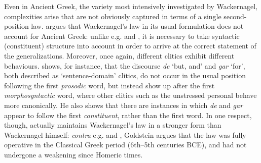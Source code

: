 Even in Ancient Greek, the variety most intensively investigated by Wackernagel, complexities arise that are not obviously captured in terms of a single second-position law. \citet{Taylor1990} argues that Wackernagel's law in its usual formulation does not account for Ancient Greek: unlike e.g. \citet{Dover1960} and \citet{Marshall1987}, it is necessary to take syntactic (constituent) structure into account in order to arrive at the correct statement of the generalizations. Moreover, once again, different clitics exhibit different behaviours. \citet[80--84]{Goldstein2016} shows, for instance, that the discourse  \textit{de} `but, and' and \textit{gar} `for', both described as `sentence-domain' clitics, do not occur in the usual position following the first \textit{prosodic} word, but instead show up after the first \textit{morphosyntactic} word, where other clitics such as the unstressed personal  behave more canonically. He also shows that there are instances in which \textit{de} and \textit{gar} appear to follow the first \textit{constituent}, rather than the first word. In one respect, though, \citet{Goldstein2016} actually maintains Wackernagel's law in a stronger form than Wackernagel himself: \textit{contra} e.g. \citet{Wackernagel1892} and \citet{Taylor1990}, Goldstein argues that the law was fully operative in the Classical Greek period (6th--5th centuries BCE), and had not undergone a weakening since Homeric times.

